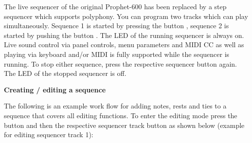 The live sequencer of the original Prophet-600 has been replaced by a step sequencer which supports polyphony. You can program two tracks which can play simultaneously. Sequence 1 is started by pressing the button \seqone, sequence 2 is started by pushing the button \seqtwo. The LED of the running sequencer is always on. Live sound control via panel controls, menu parameters and MIDI CC as well as playing via keyboard and/or MIDI is fully supported while the sequencer is running. To stop either sequence, press the respective sequencer button again. The LED of the stopped sequencer is off. 


\textbf{Creating / editing a sequence}

The following is an example work flow for adding notes, rests and ties to a sequence that covers all editing functions. To enter the editing mode press the \record button and then the respective sequencer track button as shown below (example for editing sequencer track 1):

\begin{center}
  
\end{center}

